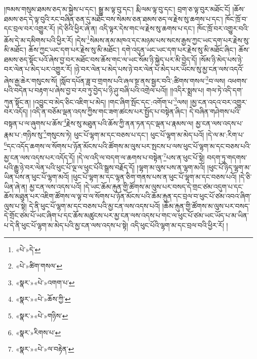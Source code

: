 །ཁམས་གསུམ་ཐམས་ཅད་མ་སྐྱེས་པ་དང་། སྒྱུ་མ་ལྟ་བུ་དང་། རྨི་ལམ་ལྟ་བུ་དང་། བྲག་ཅ་ལྟ་བུར་མཐོང་ངོ། །ཆོས་ཐམས་ཅད་དེ་ལྟ་བུའི་རང་བཞིན་ཅན་དུ་མཐོང་བས་སེམས་ཅན་ཐམས་ཅད་ལ་རྗེས་སུ་ཆགས་པ་དང་། ཁོང་ཁྲོ་བ་དང་བྲལ་བར་འགྱུར་རོ། །དེ་ཅིའི་ཕྱིར་ཞེ་ན། འདི་ལྟར་དེས་གང་ལ་རྗེས་སུ་ཆགས་པ་དང་། ཁོང་ཁྲོ་བར་འགྱུར་བའི་ཆོས་དེ་མ་དམིགས་པའི་ཕྱིར་རོ། །དེས་\footnote{«པེ་»དེ་}སེམས་ནམ་མཁའ་དང་མཉམ་པས་སངས་རྒྱས་ཀྱང་ཡང་དག་པར་རྗེས་སུ་མི་མཐོང་། ཆོས་ཀྱང་ཡང་དག་པར་རྗེས་སུ་མི་མཐོང་། དགེ་འདུན་ཡང་ཡང་དག་པར་རྗེས་སུ་མི་མཐོང་ཞིང་། ཆོས་ཐམས་ཅད་སྟོང་པའོ་ཞེས་བྱ་བར་མཐོང་བས་ཆོས་གང་ལ་ཡང་སོམ་ཉི་སྐྱེད་པར་མི་བྱེད་དོ། །སོམ་ཉི་མེད་པས་ཉེ་བར་ལེན་པ་མེད་པར་འགྱུར་རོ། །ཉེ་བར་ལེན་པ་མེད་པས་ཉེ་བར་ལེན་པ་མེད་པར་ཡོངས་སུ་མྱ་ངན་ལས་འདའོ་ཞེས་རྒྱ་ཆེར་གསུངས་སོ། །སློབ་དཔོན་ཟླ་བ་གྲགས་པའི་ཞལ་སྔ་ནས་སྦྱར་བའི་:ཚིགས་གསལ་\footnote{«པེ་»ཚིག་གསལ་}བ་ལས། འཕགས་པའི་བདེན་པ་བརྟག་པ་ཞེས་བྱ་བ་རབ་ཏུ་བྱེད་པ་ཉི་ཤུ་བཞི་པའི་འགྲེལ་པའོ།། །།འདིར་སྨྲས་པ། གལ་ཏེ་འདི་དག་ཀུན་སྟོང་ན། །འབྱུང་བ་མེད་ཅིང་འཇིག་པ་མེད། །གང་ཞིག་སྤོང་དང་:འགོག་པ་\footnote{«སྣར་»«པེ་»འགག་པ་}ལས། །མྱ་ངན་འདའ་བར་འགྱུར་བར་འདོད། །འདི་ན་བཅོམ་ལྡན་འདས་ཀྱིས་གང་ཟག་ཚངས་པར་སྤྱོད་པ་བསྟེན་ཞིང་། དེ་བཞིན་གཤེགས་པའི་བསྟན་པ་ལ་ཞུགས་པ་ཆོས་\footnote{«སྣར་»«པེ་»ཆོས་ཀྱི་}རྗེས་སུ་མཐུན་པའི་ཆོས་ཀྱི་ནན་ཏན་དང་ལྡན་པ་རྣམས་ལ། མྱ་ངན་ལས་འདས་པ་རྣམ་པ་:གཉིས་སུ་\footnote{«སྣར་»«པེ་»གཉིས་}གསུངས་ཏེ། ཕུང་པོ་ལྷག་མ་དང་བཅས་པ་དང་། ཕུང་པོ་ལྷག་མ་མེད་པའོ། །དེ་ལ་མ་:རིག་པ་\footnote{«སྣར་»རིགས་པ་}དང་འདོད་ཆགས་ལ་སོགས་པ་ཉོན་མོངས་པའི་ཚོགས་མ་ལུས་པར་སྤངས་པ་ལས་ཕུང་པོ་ལྷག་མ་དང་བཅས་པའི་མྱ་ངན་ལས་འདས་པར་འདོད་དོ། །དེ་ལ་འདི་ལ་བདག་ལ་ཆགས་པ་བསྟེན་\footnote{«སྣར་»«པེ་»ལ་བརྟེན་}པས་ན་ཕུང་པོ་སྟེ། བདག་ཏུ་གདགས་པའི་རྒྱུ་ཉེ་བར་ལེན་པའི་ཕུང་པོ་ལྔ་ལ་ཕུང་པོའི་སྒྲས་བརྗོད་དོ། །ལྷག་མ་ལུས་པས་ན་ལྷག་མའོ། །ཕུང་པོ་ཉིད་ལྷག་མ་ཡིན་པས་ན་ཕུང་པོ་ལྷག་མའོ། །ཕུང་པོ་ལྷག་མ་དང་ལྷན་ཅིག་གནས་པས་ན་ཕུང་པོ་ལྷག་མ་དང་བཅས་པའོ། །དེ་ཅི་ཡིན་ཞེ་ན། མྱ་ངན་ལས་འདས་པའོ། །དེ་ཡང་ཆོམ་རྐུན་གྱི་ཚོགས་མ་ལུས་པར་བསད་དེ་གྲང་ཙམ་འདུག་པ་དང་ཆོས་མཐུན་པར་འཇིག་ཚོགས་ལ་ལྟ་བ་ལ་སོགས་པ་ཉོན་མོངས་པའི་ཆོམ་རྐུན་དང་བྲལ་བ་ཕུང་པོ་ཙམ་འབའ་ཞིག་ལུས་པ་སྟེ། དེ་ནི་ཕུང་པོ་ལྷག་མ་དང་བཅས་པའི་མྱ་ངན་ལས་འདས་པའོ། །ཆོམ་རྐུན་གྱི་ཚོགས་མ་ལུས་པར་བསད་དེ་གྲོང་ཙམ་པོ་ཡང་ཞིག་པ་དང་ཆོས་མཚུངས་པར་མྱ་ངན་ལས་འདས་པ་གང་ལ་ཕུང་པོ་ཙམ་ཡང་ཡོད་པ་མ་ཡིན་པ་དེ་ནི་ཕུང་པོ་ལྷག་མ་མེད་པའི་མྱ་ངན་ལས་འདས་པ་སྟེ། འདི་ཕུང་པོའི་ལྷག་མ་དང་བྲལ་བའི་ཕྱིར་རོ། །
